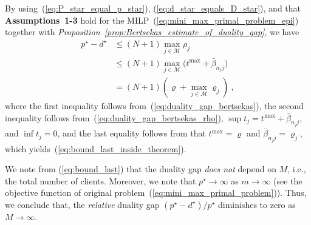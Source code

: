 \documentclass[journal, 10pt, twocolumn]{IEEEtran}
\begin{document}
By using~(\ref{eq:P_star_equal_p_star}), (\ref{eq:d_star_equals_D_star}), and that \textbf{Assumptions~1-3} hold for the MILP~(\ref{eq:mini_max_primal_problem_epi}) together with \emph{Proposition~\ref{prop:Bertsekas_estimate_of_duality_gap}}, we have
\begin{equation}\label{eq:bound_last}
\begin{split}
p^\star-d^\star & \leq (N+1)\max_{j\in\mathcal{M}}\rho_j\\
& \leq (N+1)\max_{j\in\mathcal{M}}\big(t^{\mathrm{max}}+\bar{\beta}_{n_jj}\big)\\
& = (N+1)\left(\varrho + \max_{j\in\mathcal{M}}\varrho_j\right) \ ,
\end{split}
\end{equation}
where the first inequality follows from~(\ref{eq:duality_gap_bertsekas}), the second inequality follows from~(\ref{eq:duality_gap_bertsekas_rho}), $\sup t_j = t^{\mathrm{max}}+\bar{\beta}_{n_jj}$, and $\inf t_j = 0$, and the last equality follows from that $t^{\mathrm{max}}=\varrho$ and $\bar{\beta}_{n_jj}=\varrho_j$, which yields~(\ref{eq:bound_last_inside_theorem}).

We note from (\ref{eq:bound_last}) that the duality gap \emph{does not} depend on $M$, i.e., the total number of clients. Moreover, we note that $p^\star\rightarrow\infty$ as $m\rightarrow\infty$ (see the objective function of original problem~(\ref{eq:mini_max_primal_problem})). Thus, we conclude that, the \emph{relative} duality gap $(p^\star-d^\star)/p^\star$ diminishes to zero as $M\rightarrow\infty$.




 

\end{document}
